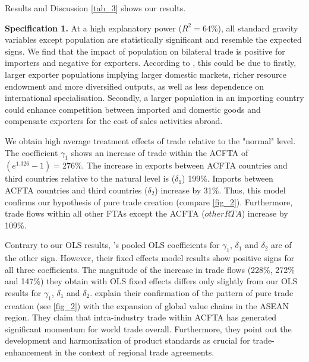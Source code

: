 \begin{section}{Results and Discussion}
\autoref{tab_3} shows our results.

\textbf{Specification 1.}
At a high explanatory power ($R^2 = 64\%$), all standard gravity variables except population are statistically significant and resemble the expected signs. We find that the impact of population on bilateral trade is positive for importers and negative for exporters. According to \cite{wla_2021}, this could be due to firstly, larger exporter populations implying larger domestic markets, richer resource endowment and more diversified outputs, as well as less dependence on international specialisation. Secondly, a larger population in an importing country could enhance competition between imported and domestic goods and compensate exporters for the cost of sales activities abroad.

We obtain high average treatment effects of trade relative to the "normal" level. The coefficient $\gamma_1$ shows an increase of trade within the ACFTA of $(e^{1.326}-1)=276\%$. The increase in exports between ACFTA countries and third countries relative to the natural level is ($\delta_1$) 199\%. Imports between ACFTA countries and third countries ($\delta_2$) increase by 31\%. Thus, this model confirms our hypothesis of pure trade creation (compare \autoref{fig_2}). Furthermore, trade flows within all other FTAs except the ACFTA ($otherRTA$) increase by 109\%.

Contrary to our OLS results, \cite{wla_2021}'s pooled OLS coefficients for $\gamma_1$, $\delta_1$ and $\delta_2$ are of the other sign. However, their fixed effects model results show positive signs for all three coefficients. The magnitude of the increase in trade flows (228\%, 272\% and 147\%) they obtain with OLS fixed effects differs only slightly from our OLS results for $\gamma_1$, $\delta_1$ and $\delta_2$. \cite{wla_2021} explain their confirmation of the pattern of pure trade creation (see \autoref{fig_2}) with the expansion of global value chains in the ASEAN region. They claim that intra-industry trade within ACFTA has generated significant momentum for world trade overall. Furthermore, they point out the development and harmonization of product standards as crucial for trade-enhancement in the context of regional trade agreements. 


\end{section}
